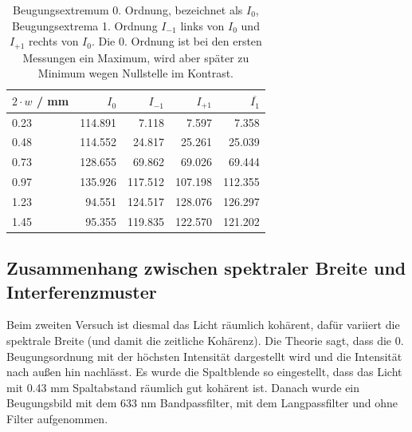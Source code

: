 \documentclass{article}
\begin{document}
\begin{table}[H]
\caption{Beugungsextremum 0. Ordnung, bezeichnet als $I_0$, Beugungsextrema 1. Ordnung $I_{-1}$ links von $I_0$ und $I_{+1}$ rechts von $I_0$. Die 0. Ordnung ist bei den ersten Messungen ein Maximum, wird aber später zu Minimum wegen Nullstelle im Kontrast.}
\begin{tabular}{l|rrrr}
$2\cdot w$ / mm & $I_0$ & $I_{-1}$ & $I_{+1}$ & $\overline{I_{1}}$ \\
\hline
0.23 & 114.891 & 7.118 & 7.597 & 7.358 \\
0.48 & 114.552 & 24.817 & 25.261 & 25.039 \\
0.73 & 128.655 & 69.862 & 69.026 & 69.444 \\
0.97 & 135.926 & 117.512 & 107.198 & 112.355 \\
1.23 & 94.551 & 124.517 & 128.076 & 126.297 \\
1.45 & 95.355 &  119.835 & 122.570 & 121.202
\end{tabular}
\end{table}





%


\newpage
\subsection{Zusammenhang zwischen spektraler Breite und Interferenzmuster}

Beim zweiten Versuch ist diesmal das Licht räumlich kohärent, dafür variiert die spektrale Breite (und damit die zeitliche Kohärenz). Die Theorie sagt, dass die 0. Beugungsordnung mit der höchsten Intensität dargestellt wird und die Intensität nach außen hin nachlässt. Es wurde die Spaltblende so eingestellt, dass das Licht mit 0.43 mm Spaltabstand räumlich gut kohärent ist. Danach wurde ein Beugungsbild mit dem 633 nm Bandpassfilter, mit dem Langpassfilter und ohne Filter aufgenommen. 
\end{document}
